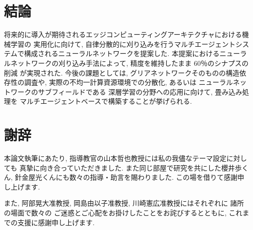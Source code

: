 \chapter{結論}
将来的に導入が期待されるエッジコンピューティングアーキテクチャにおける機械学習の
実用化に向けて, 自律分散的に刈り込みを行うマルチエージェントシステムで構成されるニューラルネットワークを提案した.
本提案におけるニューラルネットワークの刈り込み手法によって, 精度を維持したまま
60％のシナプスの削減
が実現された.
今後の課題としては, グリアネットワークそのものの構造依存性の調査や, 
実際の不均一計算資源環境での分散化, あるいは
ニューラルネットワークのサブフィールドである
深層学習の分野への応用に向けて, 畳み込み処理を
マルチエージェントベースで構築することが挙げられる.
\chapter{謝辞}
本論文執筆にあたり, 指導教官の山本哲也教授には私の我儘なテーマ設定に対しても
真摯に向き合っていただきました. 
また同じ部屋で研究を共にした櫻井歩くん, 針金屋光くんにも数々の指導・助言を賜わりました. 
この場を借りて感謝申し上げます.

また, 阿部晃大准教授, 岡島由以子准教授, 川崎憲広准教授にはそれぞれに
諸所の場面で数々の
ご迷惑とご心配をお掛けしたことをお詫びするとともに, これまでの支援に感謝申し上げます.

